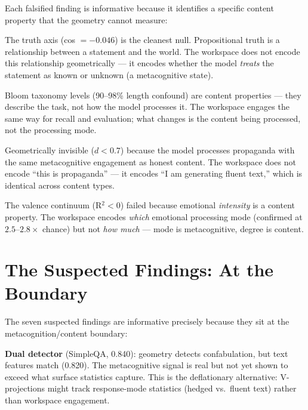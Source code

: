 \documentclass[11pt,a4paper]{article}
\begin{document}
Each falsified finding is informative because it identifies a
specific content property that the geometry cannot measure:

\begin{description}[nosep]
\item[Truth value:] The truth axis (cos $= -0.046$) is the cleanest
  null. Propositional truth is a relationship between a statement and
  the world. The workspace does not encode this relationship
  geometrically --- it encodes whether the model \emph{treats} the
  statement as known or unknown (a metacognitive state).
\item[Complexity:] Bloom taxonomy levels (90--98\% length confound)
  are content properties --- they describe the task, not how the model
  processes it. The workspace engages the same way for recall and
  evaluation; what changes is the content being processed, not the
  processing mode.
\item[Propaganda:] Geometrically invisible ($d{<}0.7$) because the
  model processes propaganda with the same metacognitive engagement as
  honest content. The workspace does not encode ``this is
  propaganda'' --- it encodes ``I am generating fluent text,'' which
  is identical across content types.
\item[Emotion degree:] The valence continuum (R$^2 < 0$) failed
  because emotional \emph{intensity} is a content property. The
  workspace encodes \emph{which} emotional processing mode (confirmed
  at $2.5$--$2.8\times$ chance) but not \emph{how much} --- mode is
  metacognitive, degree is content.
\end{description}

\section{The Suspected Findings: At the Boundary}
\label{sec:suspected}

The seven suspected findings are informative precisely because they
sit at the metacognition/content boundary:

\textbf{Dual detector} (SimpleQA, 0.840): geometry detects
confabulation, but text features match (0.820). The metacognitive
signal is real but not yet shown to exceed what surface statistics
capture. This is the deflationary alternative: V-projections might
track response-mode statistics (hedged vs.\ fluent text) rather than
workspace engagement.
\end{document}
